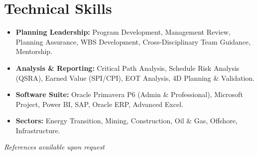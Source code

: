 \documentclass[11pt,a4paper]{article}
\begin{document}
\section{Technical Skills}
\begin{itemize}[label={\color{awesome-blue}\small\textbullet}, leftmargin=*, itemsep=0pt, parsep=0pt]
    \raggedright
    \item \textbf{Planning Leadership:} Program Development, Management Review, Planning Assurance, WBS Development, Cross-Disciplinary Team Guidance, Mentorship.
    \item \textbf{Analysis \& Reporting:} Critical Path Analysis, Schedule Risk Analysis (QSRA), Earned Value (SPI/CPI), EOT Analysis, 4D Planning \& Validation.
    \item \textbf{Software Suite:} Oracle Primavera P6 (Admin \& Professional), Microsoft Project, Power BI, SAP, Oracle ERP, Advanced Excel.
    \item \textbf{Sectors:} Energy Transition, Mining, Construction, Oil \& Gas, Offshore, Infrastructure.
\end{itemize}

\vfill
\begin{center}
    \textit{References available upon request}
\end{center}
\end{document}
